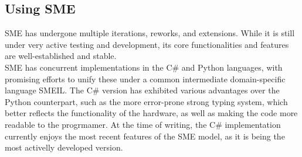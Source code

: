 \subsection{Using SME}
SME has undergone multiple iterations, reworks, and extensions. While it is still
under very active testing and development, its core functionalities and features
 are well-established and stable\cite{bus_centric_sme}.\\
SME has concurrent implementations in the C\# and Python languages, with promising
efforts to unify these under a common intermediate domain-specific language 
SMEIL\cite{smeil}. The C\# version has exhibited various advantages over the 
Python counterpart, such as the more error-prone strong typing system, which 
better reflects the functionality of the hardware, as well as making the code
more readable to the progrmamer. At the time of writing, the C\# implementation currently
enjoys the most recent features of the SME model, as it is being the most activelly 
developed version. 
